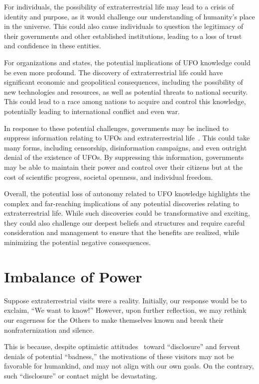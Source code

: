 For individuals, the possibility of extraterrestrial life may lead to a crisis of identity and purpose, as it would challenge our understanding of humanity's place in the universe. This could also cause individuals to question the legitimacy of their governments and other established institutions, leading to a loss of trust and confidence in these entities.

For organizations and states, the potential implications of UFO knowledge could be even more profound. The discovery of extraterrestrial life could have significant economic and geopolitical consequences, including the possibility of new technologies and resources, as well as potential threats to national security. This could lead to a race among nations to acquire and control this knowledge, potentially leading to international conflict and even war.

In response to these potential challenges, governments may be inclined to suppress information relating to UFOs and extraterrestrial life~\cite{Wendt_2008}. This could take many forms, including censorship, disinformation campaigns, and even outright denial of the existence of UFOs. By suppressing this information, governments may be able to maintain their power and control over their citizens but at the cost of scientific progress, societal openness, and individual freedom.

Overall, the potential loss of autonomy related to UFO knowledge highlights the complex and far-reaching implications of any potential discoveries relating to extraterrestrial life. While such discoveries could be transformative and exciting, they could also challenge our deepest beliefs and structures and require careful consideration and management to ensure that the benefits are realized, while minimizing the potential negative consequences.

\section{Imbalance of Power}
\label{2023-UFO-part-Speculation-possible-consequences-pt} %

Suppose extraterrestrial visits were a reality.
Initially, our response would be to exclaim, ``We want to know!'' However, upon further reflection, we may rethink our eagerness for the Others to make themselves known
and break their nonfraternization and silence.

This is because, despite optimistic attitudes~\cite{Mazzola2020Apr} toward ``disclosure''
and fervent denials of potential ``badness,'' the motivations of these visitors may not be favorable for humankind,
and may not align with our own goals.
On the contrary, such ``disclosure'' or contact might be devastating.


